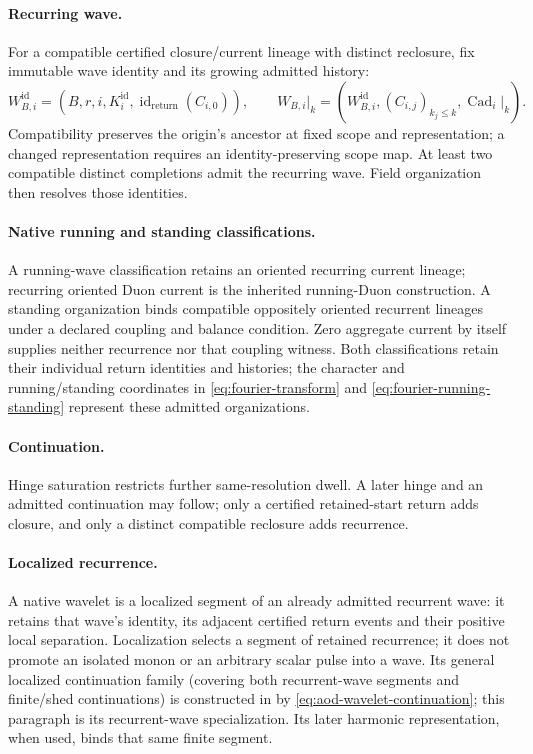 \paragraph{Recurring wave.}
For a compatible certified closure/current lineage with distinct reclosure,
fix immutable wave identity and its growing admitted history:
\begin{equation}
W^{\mathrm{id}}_{B,i}=(B,r,i,K_i^{\mathrm{id}},
\operatorname{id}_{\mathrm{return}}(C_{i,0})),\qquad
W_{B,i}|_k=(W^{\mathrm{id}}_{B,i},(C_{i,j})_{k_j\le k},\operatorname{Cad}_i|_k).
\label{eq:wave-identity}
\end{equation}
Compatibility preserves the origin's ancestor at fixed scope and representation;
a changed representation requires an identity-preserving scope map. At least two
compatible distinct completions admit the recurring wave. Field organization
then resolves those identities.

\paragraph{Native running and standing classifications.}
\label{eq:native-running-standing}
A running-wave classification retains an oriented recurring current lineage;
recurring oriented Duon current is the inherited running-Duon construction.
A standing organization binds compatible oppositely oriented recurrent
lineages under a declared coupling and balance condition. Zero aggregate
current by itself supplies neither recurrence nor that coupling witness.
Both classifications retain their individual return identities and histories;
the character and running/standing coordinates in \eqref{eq:fourier-transform}
and \eqref{eq:fourier-running-standing} represent these admitted organizations.

\paragraph{Continuation.}
Hinge saturation restricts further same-resolution dwell. A later hinge and
an admitted continuation may follow; only a certified retained-start return
adds closure, and only a distinct compatible reclosure adds recurrence.
\paragraph{Localized recurrence.}
\label{subsec:localized-wavelet}
A native wavelet is a localized segment of an already admitted recurrent wave:
it retains that wave's identity, its adjacent certified return events and their
positive local separation. Localization selects a segment of retained recurrence;
it does not promote an isolated monon or an arbitrary scalar pulse into a wave.
Its general localized continuation family (covering both recurrent-wave segments
and finite/shed continuations) is constructed in 
by \eqref{eq:aod-wavelet-continuation}; this paragraph is its recurrent-wave
specialization. Its later harmonic representation, when used, binds that same
finite segment.
